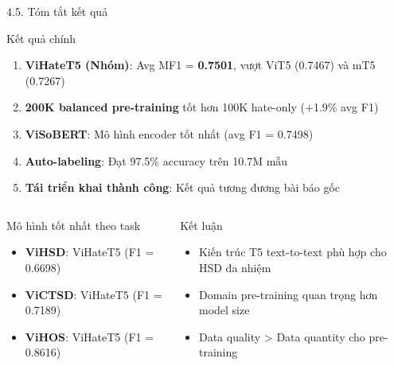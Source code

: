 \documentclass[11pt, aspectratio=169]{beamer}
\begin{document}
\begin{frame}[fragile, shrink=15]{4.5. Tóm tắt kết quả}

\begin{block}{Kết quả chính}
  \begin{enumerate}
    \item \textbf{ViHateT5 (Nhóm)}: Avg MF1 = \textbf{0.7501}, vượt ViT5 (0.7467) và mT5 (0.7267)
    \item \textbf{200K balanced pre-training} tốt hơn 100K hate-only (+1.9\% avg F1)
    \item \textbf{ViSoBERT}: Mô hình encoder tốt nhất (avg F1 = 0.7498)
    \item \textbf{Auto-labeling}: Đạt 97.5\% accuracy trên 10.7M mẫu
    \item \textbf{Tái triển khai thành công}: Kết quả tương đương bài báo gốc
  \end{enumerate}
\end{block}

\vspace{0.3cm}
\begin{columns}[T]
  \begin{block}{Mô hình tốt nhất theo task}
    \begin{itemize}
      \item \textbf{ViHSD}: ViHateT5 (F1 = 0.6698)
      \item \textbf{ViCTSD}: ViHateT5 (F1 = 0.7189)
      \item \textbf{ViHOS}: ViHateT5 (F1 = 0.8616)
    \end{itemize}
  \end{block}

  \begin{block}{Kết luận}
    \begin{itemize}
      \item Kiến trúc T5 text-to-text phù hợp cho HSD đa nhiệm
      \item Domain pre-training quan trọng hơn model size
      \item Data quality > Data quantity cho pre-training
    \end{itemize}
  \end{block}
\end{columns}
\end{frame}
\end{document}
